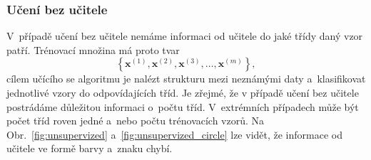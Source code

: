 \subsubsection*{Učení bez učitele}
\par{
V~případě učení bez učitele nemáme informaci od učitele do jaké třídy daný vzor patří. Trénovací množina má proto tvar
\begin{equation}
		\left\lbrace \bm{x}^{\left( 1 \right)} ,  \bm{x}^{\left( 2 \right)},   \bm{x}^{\left( 3 \right)} ,  \ldots,  \bm{x}^{\left( m \right)} \right\rbrace ,
\end{equation}
cílem učícího se algoritmu je nalézt strukturu mezi neznámými daty a~klasifikovat jednotlivé vzory do odpovídajících tříd. Je zřejmé, že v případě učení bez učitele postrádáme důležitou informaci o~počtu tříd. V~extrémních případech může být počet tříd roven jedné a~nebo počtu trénovacích vzorů. Na Obr.~\ref{fig:unsupervized}} a~\ref{fig:unsupervized_circle} lze vidět, že informace od učitele ve formě barvy a~znaku chybí.
